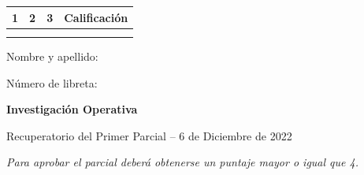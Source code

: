 \documentclass[a4paper,oneside,12pt]{amsart}
\newcommand{\nombremateria}
{Investigaci\'on Operativa}
\newcommand{\numeroparcial}
    {Recuperatorio del Primer Parcial }
\newcommand{\fecha}
    {6 de Diciembre de 2022}
\theoremstyle{definition}
\begin{document}
\hfill \hfill
\begin{tabular}[c]{|c|c|c|c|}
\hline 
1 & 2 & 3 & Calificaci\'on \\ \hline \hline
\hspace{1.2 cm} & \hspace{1.2 cm} & \hspace{1.2 cm} &\hspace{1.5 cm} \\
\hspace{1.2 cm} & \hspace{1.2 cm} & \hspace{1.2 cm} &\hspace{1.5 cm} \\ \hline

\end{tabular}

\vspace{-1cm}

\noindent Nombre y apellido:

\vspace{0.2cm}

\noindent Número de libreta:

\noindent \hrulefill 

\smallskip
\renewcommand{\baselinestretch}{1.1}

\begin{center}
	\large \textbf{\nombremateria} 
	
	\numeroparcial -- \fecha
\end{center}

\vspace{.6cm}
\renewcommand{\theenumi}{\textbf{\arabic{enumi}}}

\noindent\textit{Para aprobar el parcial deberá obtenerse un puntaje mayor o igual que 4.}

\end{document}
